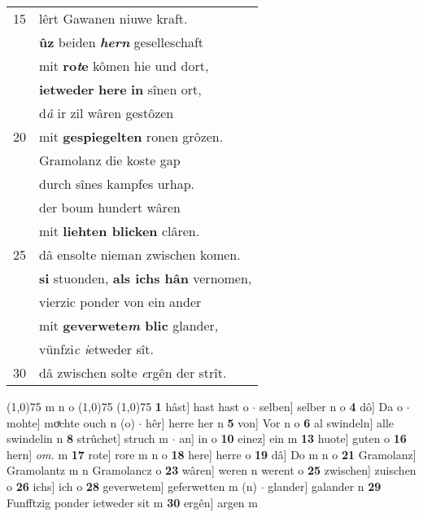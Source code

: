 \documentclass[8pt,a4paper,notitlepage]{article}
\begin{document}
\begin{table}[ht]
\begin{minipage}[t]{0.5\linewidth}
\begin{tabular}{rl}
15 & lêrt Gawanen niuwe kraft.\\ 
 & \textbf{ûz} beiden \textit{\textbf{hern}} geselleschaft\\ 
 & mit \textbf{ro\textit{t}e} kômen hie und dort,\\ 
 & \textbf{ietweder} \textbf{here} \textbf{in} sînen ort,\\ 
 & d\textit{â} ir zil wâren gestôzen\\ 
20 & mit \textbf{gespiegelten} ronen grôzen.\\ 
 & Gramolanz die koste gap\\ 
 & durch sînes kampfes urhap.\\ 
 & der boum hundert wâren\\ 
 & mit \textbf{liehten blicken} clâren.\\ 
25 & dâ ensolte nieman zwischen komen.\\ 
 & \textbf{si} stuonden, \textbf{als ichs hân} vernomen,\\ 
 & vierzic ponder von ein ander\\ 
 & mit \textbf{geverwete\textit{m} blic} glander,\\ 
 & vünfzi\textit{c i}etweder sît.\\ 
30 & dâ zwischen solte \textit{e}rgên der strît.\\ 
\end{tabular}
\scriptsize
\line(1,0){75} \newline
m n o \newline
\line(1,0){75} \newline
\newline
\line(1,0){75} \newline
\textbf{1} hâst] hast hast o  $\cdot$ selben] selber n o \textbf{4} dô] Da o  $\cdot$ mohte] moͯchte ouch n (o)  $\cdot$ hêr] herre her n \textbf{5} von] Vor n o \textbf{6} al swindeln] alle swindelin n \textbf{8} strûchet] struch m  $\cdot$ an] in o \textbf{10} einez] ein m \textbf{13} huote] guten o \textbf{16} hern] \textit{om.} m \textbf{17} rote] rore m n o \textbf{18} here] herre o \textbf{19} dâ] Do m n o \textbf{21} Gramolanz] Gramolantz m n Gramolancz o \textbf{23} wâren] weren n werent o \textbf{25} zwischen] zuischen o \textbf{26} ichs] ich o \textbf{28} geverwetem] geferwetten m (n)  $\cdot$ glander] galander n \textbf{29} Funfftzig ponder ietweder sit m \textbf{30} ergên] argen m \newline
\end{minipage}
\end{table}
\newpage
\end{document}

